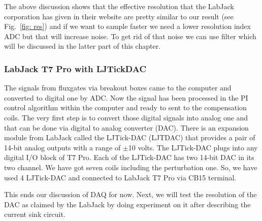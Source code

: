 The above discussion shows that the effective resolution that the LabJack corporation has given in their website are pretty similar to our result (see Fig.~\ref{fig: res}) and if we want to sample faster we need a lower resolution index ADC but that will increase noise. To get rid of that noise we can use filter which will be discussed in the latter part of this chapter.

\subsubsection{LabJack T7 Pro with LJTickDAC}
The signals from fluxgates via breakout boxes came to the computer and converted to digital one by ADC. Now the signal has been processed in the PI control algorithm within the computer and ready to sent to the compensation coils. The very first step is to convert those digital signals into analog one and that can be done via digital to analog converter (DAC). There is an expansion module from LabJack called the LJTick-DAC (LJTDAC) that provides a pair of 14-bit analog outputs with a range of $\pm$10 volts. The LJTick-DAC plugs into any digital I/O block of T7 Pro. Each of the LJTick-DAC has two 14-bit DAC in its two channel. We have got seven coils including the perturbation one. So, we have used 4 LJTick-DAC and connected to LabJack T7 Pro via CB15 terminal. 





This ends our discussion of DAQ for now. Next, we will test the resolution of the DAC as claimed by the LabJack by doing experiment on it after describing the current sink circuit.


